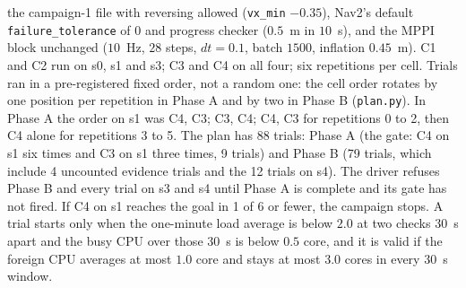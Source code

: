 \documentclass[journal]{IEEEtran}
\begin{document}
the campaign-1 file with reversing allowed (\texttt{vx\_min} $-0.35$), Nav2's default
\texttt{failure\_tolerance} of $0$ and progress checker ($0.5$~m in $10$~s), and the MPPI
block unchanged ($10$~Hz, $28$ steps, $dt=0.1$, batch $1500$, inflation $0.45$~m). C1 and
C2 run on s0, s1 and s3; C3 and C4 on all four; six repetitions per cell. Trials ran in a
pre-registered fixed order, not a random one: the cell order rotates by one position per repetition in Phase A and by two in Phase B
(\texttt{plan.py}). In Phase A the order on s1
was C4, C3; C3, C4; C4, C3 for repetitions 0 to 2, then C4 alone for repetitions 3 to 5. The plan has
88 trials: Phase A (the gate: C4 on s1 six times and C3 on s1 three times, 9 trials) and Phase B (79
trials, which include 4 uncounted evidence trials and the 12 trials on s4). The driver refuses
Phase B and every trial on s3 and s4 until Phase A is complete and its gate has not fired. If
C4 on s1 reaches the goal in 1 of 6 or fewer, the campaign stops. A trial starts only when the
one-minute load average is below $2.0$ at two checks $30$~s apart and the busy CPU over those
$30$~s is below $0.5$ core, and it is valid if the foreign CPU averages at most $1.0$ core and
stays at most $3.0$ cores in every $30$~s window.
\end{document}
